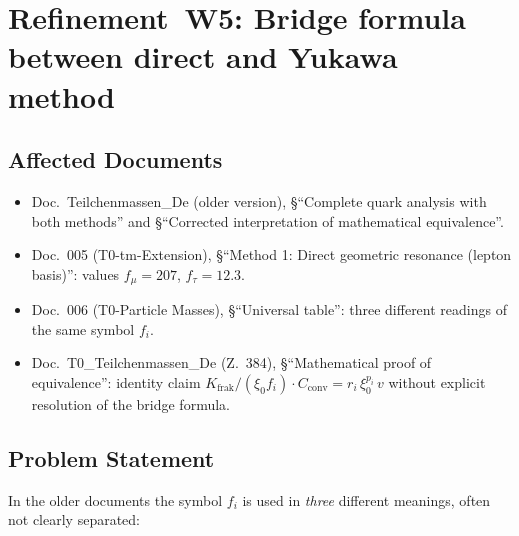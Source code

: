 \section{\texorpdfstring{Refinement~W5: Bridge formula between direct and Yukawa method}{Refinement W5: Bridge formula between direct and Yukawa method}}

\subsection*{Affected Documents}

\begin{itemize}
  \item Doc.~Teilchenmassen\_De (older version), §\enquote{Complete
        quark analysis with both methods} and §\enquote{Corrected
        interpretation of mathematical equivalence}.
  \item Doc.~005 (T0-tm-Extension), §\enquote{Method 1: Direct
        geometric resonance (lepton basis)}: values $f_\mu = 207$,
        $f_\tau = 12.3$.
  \item Doc.~006 (T0-Particle Masses), §\enquote{Universal table}:
        three different readings of the same symbol $f_i$.
  \item Doc.~T0\_Teilchenmassen\_De (Z.~384), §\enquote{Mathematical
        proof of equivalence}: identity claim
        $K_{\text{frak}}/(\xi_0 f_i)\cdot C_{\text{conv}}
        = r_i\,\xi_0^{p_i}\,v$
        without explicit resolution of the bridge formula.
\end{itemize}

\subsection*{Problem Statement}

In the older documents the symbol $f_i$ is used in \emph{three}
different meanings, often not clearly separated:

\begin{center}
\renewcommand{\arraystretch}{1.4}
{\footnotesize
{}
}
\renewcommand{\arraystretch}{1.0}
\end{center}

